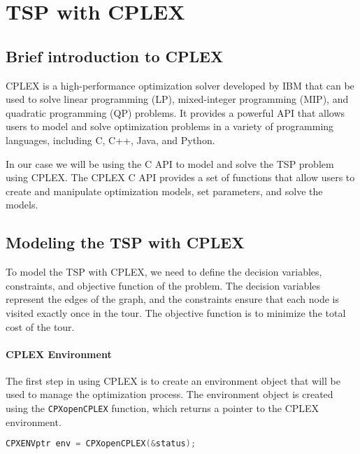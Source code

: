 \documentclass{article}
\begin{document}
\section{TSP with CPLEX}

\subsection{Brief introduction to CPLEX}
CPLEX is a high-performance optimization solver developed by IBM that can be used to solve linear programming (LP), mixed-integer programming (MIP), and quadratic programming (QP) problems.
It provides a powerful API that allows users to model and solve optimization problems in a variety of programming languages, including C, C++, Java, and Python.

In our case we will be using the C API to model and solve the TSP problem using CPLEX. The CPLEX C API provides a set of functions that allow users to create and manipulate optimization models, 
set parameters, and solve the models.

\subsection{Modeling the TSP with CPLEX}
To model the TSP with CPLEX, we need to define the decision variables, constraints, and objective function of the problem. 
The decision variables represent the edges of the graph, and the constraints ensure that each node is visited exactly once in the tour.
The objective function is to minimize the total cost of the tour.

\paragraph{CPLEX Environment}
The first step in using CPLEX is to create an environment object that will be used to manage the optimization process.
The environment object is created using the \texttt{CPXopenCPLEX} function, which returns a pointer to the CPLEX environment.

\begin{lstlisting}[language=C]
	CPXENVptr env = CPXopenCPLEX(&status);
\end{lstlisting}
\end{document}
